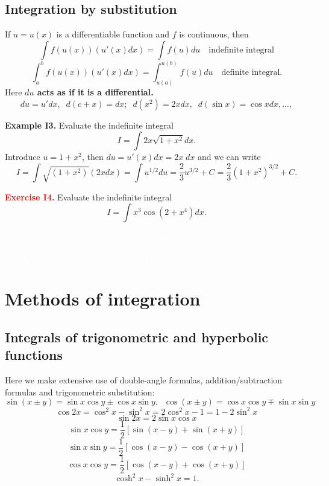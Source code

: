 \documentclass{article}
\begin{document}
\subsection{Integration by substitution}

If $ u=u(x)$ is a differentiable function and $f$ is continuous, then
$$
\int f( u(x) ) \left( u'(x) dx \right) = \int f( u ) du \quad \mbox{indefinite integral}
$$
$$
\int_a^b f( u(x) ) \left( u'(x) dx \right) = \int_{u(a)}^{u(b)} f(u ) du \quad \mbox{definite integral}.
$$
Here {\bf  $d u$ acts as if it is a differential.}
 $$
 d u= u' d x, \;\;  d (c+x)=dx; \;\; d (x^2)=2x dx, \;\; d (\sin x)= \cos x d x, ...,
 $$
\hrulefill

 \textbf{Example I3.} Evaluate  the indefinite integral
$$
I=\int 2 x \sqrt{1+x^2}  dx.
$$
Introduce $u=1+x^2$, then $d u =u'(x) d x=2x \; dx$ and we can write
$$
I=\int  \sqrt{(1+x^2)} (2x dx)= \int  {u}^{1/2} du=\frac{2}{3}
u^{3/2}+C= \frac{2}{3} (1+x^2)^{3/2}+C .
$$

\newpage
\textcolor{red}{\textbf{Exercise I4.}} Evaluate  the indefinite integral
$$
I=\int  x^3 \cos (2+x^4)  dx.
$$

\textcolor{white}{then $d u =u'(x) d x=4x^3 \; dx$ and we can write
{\small
$$
I=\int  \cos(2+x^4) \frac{1}{4} (4x^3 dx) = \int \frac{1}{4} \cos
u du=\frac{1}{4} \sin u +C = \frac{1}{4} \sin (2+x^4) +C.
$$
}
}
\vspace*{100px}

\section{Methods of integration} 
\subsection{Integrals of trigonometric and hyperbolic functions}

Here we make extensive use of double-angle formulas,  addition/subtraction formulas
and trigonometric substitution:
$$
\sin (x\pm y) =\sin x \cos y \pm \cos x \sin y, \;\; \cos (x\pm y) =\cos x \cos y \mp \sin x \sin y
$$
$$
\cos 2x =\cos^2 x -\sin^2 x = 2 \cos^2 x - 1 = 1 - 2 \sin^2 x
$$
$$
\sin 2x =2 \sin x \cos x
$$
$$
\sin x \cos y =\frac{1}{2} \left[ \sin(x-y)+ \sin(x+y) \right]
$$
$$
\sin x \sin y =\frac{1}{2} \left[ \cos(x-y) - \cos(x+y) \right]
$$
$$
\cos x \cos y =\frac{1}{2} \left[ \cos(x-y)+ \cos(x+y) \right]
$$
$$
\cosh^2x - \sinh^2 x =1.
$$
\hrulefill
\end{document}
